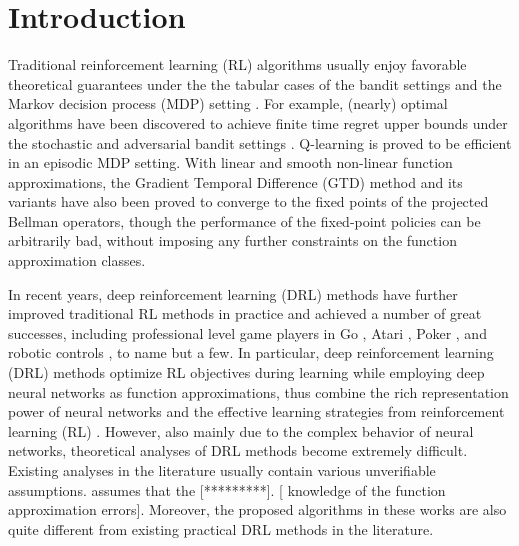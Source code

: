 \section{Introduction}
\label{sec:introduction}

Traditional reinforcement learning (RL) algorithms usually enjoy favorable theoretical guarantees under the the tabular cases of the bandit settings and the Markov decision process (MDP) setting \citep{sutton2018reinforcement}.
For example, (nearly) optimal algorithms have been discovered to achieve finite time regret upper bounds under the stochastic and adversarial bandit settings \citep{bubeck2012regret}. Q-learning is proved to be efficient in an episodic MDP setting\cite{jin2018q}. 
With linear and smooth non-linear function approximations, the Gradient Temporal Difference (GTD) method and its variants have also been proved to converge to the fixed points of the projected Bellman operators, though the performance of the fixed-point policies can be arbitrarily bad, without imposing any further constraints on the function approximation classes\citep{sutton2009fast,sutton2009convergent,bhatnagar2009convergent}.

In recent years, deep reinforcement learning (DRL) methods have further improved traditional RL methods in practice and achieved a number of great successes, including professional level game players in Go \citep{silver2016masteringA,silver2017masteringB}, Atari \citep{mnih2015human}, Poker \citep{moravvcik2017deepstack}, and robotic controls \citep{lillicrap2015continuous,levine2016end}, to name but a few.
In particular,  deep reinforcement learning (DRL) methods optimize RL objectives during learning while employing deep neural networks as function approximations, thus combine the rich representation power of neural networks and the effective learning strategies from reinforcement learning (RL) \citep{sutton2018reinforcement}. 
However, also mainly due to the complex behavior of neural networks, theoretical analyses of DRL methods become extremely difficult.
Existing analyses in the literature usually contain various unverifiable assumptions. \citep{krishnamurthy2016pac} assumes that the [*********]. [ \citep{dai2018sbeed} knowledge of the function approximation errors].
Moreover, the proposed algorithms in these works are also quite different from existing practical DRL methods in the literature.

